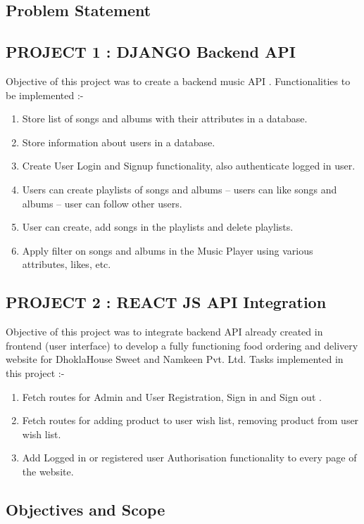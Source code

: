 \documentclass[a4paper, 12pt]{article}
\begin{document}
\begin{center}
    \section{Problem Statement}
\end{center}
\subsection{PROJECT 1 : DJANGO Backend API}
 \hspace*{10mm}Objective of this project was to create a backend music API . Functionalities to be implemented :-
 \begin{enumerate}
    \item Store list of songs and albums with their attributes in a database.
    \item Store information about users in a database.
    \item Create User Login and Signup functionality, also authenticate logged in user.
    \item Users can create playlists of songs and albums – users can like songs and albums – user can follow other users.
    \item User can create, add songs in the playlists and delete playlists.
    \item Apply filter on songs and albums in the Music Player using various attributes, likes, etc.
\end{enumerate}
\subsection{PROJECT 2 : REACT JS API Integration}
\hspace*{10mm}Objective of this project was to integrate backend API already created in frontend (user interface) to develop a fully functioning food ordering and delivery website for DhoklaHouse Sweet and Namkeen Pvt. Ltd. Tasks implemented in this project :-
\begin{enumerate}
    \item Fetch routes for Admin and User Registration, Sign in and Sign out .
    \item Fetch routes for adding product to user wish list, removing product from user wish list.
    \item Add Logged in or registered user Authorisation functionality to every page of the website.
\end{enumerate}
\vspace{20pt}
\newpage
\begin{center}
    \section{Objectives and Scope}
\end{center}
\end{document}
